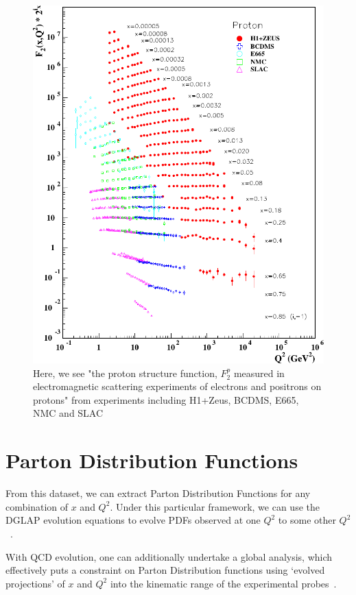 \begin{figure}[ht]
  \centering
  \includegraphics[width=\linewidth]{./figures/F2_structure_function.pdf}
  \caption{
		Here, we see "the proton structure function, $F_2^p$ measured in
		electromagnetic scattering experiments of electrons and positrons on
		protons" from experiments including H1+Zeus, BCDMS, E665, NMC and
		SLAC~\cite{ReviewEidelman2012}
  }
  \label{fig:f2_world_data}
\end{figure}

\clearpage
\section{Parton Distribution Functions}
\label{sec:parton_distribution_functions}

From this dataset, we can extract Parton Distribution Functions for any
combination of $x$ and $Q^2$. Under this particular framework, we can use the
DGLAP evolution equations to evolve PDFs observed at one $Q^2$ to some other
$Q^2$~\cite{Altarelli2009}.

With QCD evolution, one can additionally undertake a global analysis, which
effectively puts a constraint on Parton Distribution functions using `evolved
projections' of $x$ and $Q^2$ into the kinematic range of the experimental
probes~\cite{Gal2014b}. 

